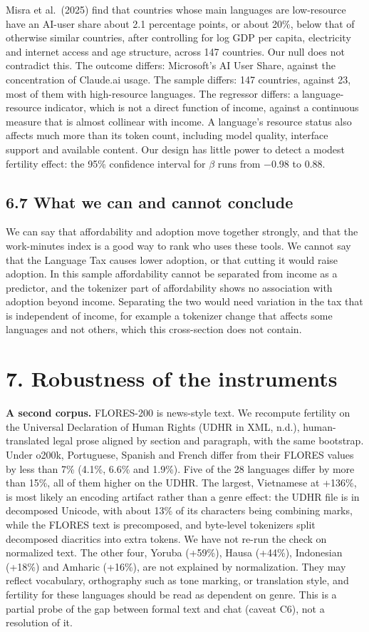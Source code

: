 \documentclass[11pt]{article}
\begin{document}
Misra et al.~(2025) find that countries whose main languages are low-resource have an AI-user share about 2.1 percentage points, or about 20\%, below that of otherwise similar countries, after controlling for log GDP per capita, electricity and internet access and age structure, across 147 countries. Our null does not contradict this. The outcome differs: Microsoft's AI User Share, against the concentration of Claude.ai usage. The sample differs: 147 countries, against 23, most of them with high-resource languages. The regressor differs: a language-resource indicator, which is not a direct function of income, against a continuous measure that is almost collinear with income. A language's resource status also affects much more than its token count, including model quality, interface support and available content. Our design has little power to detect a modest fertility effect: the 95\% confidence interval for \(\beta\) runs from −0.98 to 0.88.

\subsection{6.7 What we can and cannot conclude}

We can say that affordability and adoption move together strongly, and that the work-minutes index is a good way to rank who uses these tools. We cannot say that the Language Tax causes lower adoption, or that cutting it would raise adoption. In this sample affordability cannot be separated from income as a predictor, and the tokenizer part of affordability shows no association with adoption beyond income. Separating the two would need variation in the tax that is independent of income, for example a tokenizer change that affects some languages and not others, which this cross-section does not contain.

\section{7. Robustness of the instruments}

\textbf{A second corpus.} FLORES-200 is news-style text. We recompute fertility on the Universal Declaration of Human Rights (UDHR in XML, n.d.), human-translated legal prose aligned by section and paragraph, with the same bootstrap. Under o200k, Portuguese, Spanish and French differ from their FLORES values by less than 7\% (4.1\%, 6.6\% and 1.9\%). Five of the 28 languages differ by more than 15\%, all of them higher on the UDHR. The largest, Vietnamese at +136\%, is most likely an encoding artifact rather than a genre effect: the UDHR file is in decomposed Unicode, with about 13\% of its characters being combining marks, while the FLORES text is precomposed, and byte-level tokenizers split decomposed diacritics into extra tokens. We have not re-run the check on normalized text. The other four, Yoruba (+59\%), Hausa (+44\%), Indonesian (+18\%) and Amharic (+16\%), are not explained by normalization. They may reflect vocabulary, orthography such as tone marking, or translation style, and fertility for these languages should be read as dependent on genre. This is a partial probe of the gap between formal text and chat (caveat C6), not a resolution of it.
\end{document}
